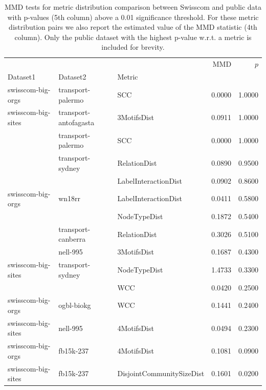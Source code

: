 \begin{table}[H]
    \centering
        \caption[MMD tests for metric distribution comparison between Swisscom and public data.]{MMD tests for metric distribution comparison between Swisscom and public data with p-values (5th column) above a 0.01 significance threshold. For these metric distribution pairs we also report the estimated value of the MMD statistic (4th column). Only the public dataset with the highest p-value w.r.t. a metric is included for brevity.}
    \label{tab:mmd}
\begin{adjustbox}{width=0.75\columnwidth}
\begin{tabular}{lllrr}
\toprule
                   &           &                           &    MMD &  $p$ \\
Dataset1 & Dataset2 & Metric &        &            \\
\midrule
swisscom-big-orgs & transport-palermo & SCC & 0.0000 &     1.0000 \\
swisscom-big-sites & transport-antofagasta & 3MotifsDist & 0.0911 &     1.0000 \\
                   & transport-palermo & SCC & 0.0000 &     1.0000 \\
                   & transport-sydney & RelationDist & 0.0890 &     0.9500 \\
                   &           & LabelInteractionDist & 0.0902 &     0.8600 \\
swisscom-big-orgs & wn18rr & LabelInteractionDist & 0.0411 &     0.5800 \\
                   &           & NodeTypeDist & 0.1872 &     0.5400 \\
                   & transport-canberra & RelationDist & 0.3026 &     0.5100 \\
                   & nell-995 & 3MotifsDist & 0.1687 &     0.4300 \\
swisscom-big-sites & transport-sydney & NodeTypeDist & 1.4733 &     0.3300 \\
                   &           & WCC & 0.0420 &     0.2500 \\
swisscom-big-orgs & ogbl-biokg & WCC & 0.1441 &     0.2400 \\
swisscom-big-sites & nell-995 & 4MotifsDist & 0.0494 &     0.2300 \\
swisscom-big-orgs & fb15k-237 & 4MotifsDist & 0.1081 &     0.0900 \\
swisscom-big-sites & fb15k-237 & DisjointCommunitySizeDist & 0.1601 &     0.0200 \\
\bottomrule
\end{tabular}
\end{adjustbox}
\end{table}


